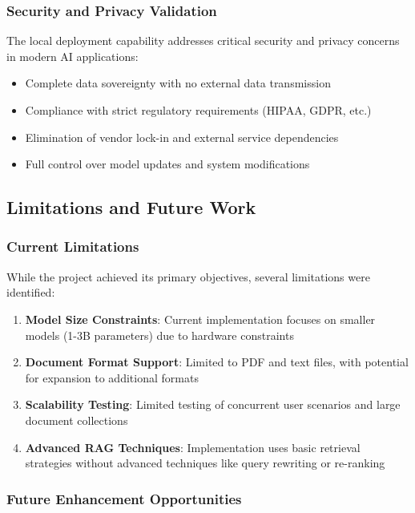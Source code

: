 \subsubsection{Security and Privacy Validation}

The local deployment capability addresses critical security and privacy concerns in modern AI applications:

\begin{itemize}
    \item Complete data sovereignty with no external data transmission
    \item Compliance with strict regulatory requirements (HIPAA, GDPR, etc.)
    \item Elimination of vendor lock-in and external service dependencies
    \item Full control over model updates and system modifications
\end{itemize}

\subsection{Limitations and Future Work}

\subsubsection{Current Limitations}

While the project achieved its primary objectives, several limitations were identified:

\begin{enumerate}
    \item \textbf{Model Size Constraints}: Current implementation focuses on smaller models (1-3B parameters) due to hardware constraints
    \item \textbf{Document Format Support}: Limited to PDF and text files, with potential for expansion to additional formats
    \item \textbf{Scalability Testing}: Limited testing of concurrent user scenarios and large document collections
    \item \textbf{Advanced RAG Techniques}: Implementation uses basic retrieval strategies without advanced techniques like query rewriting or re-ranking
\end{enumerate}

\subsubsection{Future Enhancement Opportunities}

